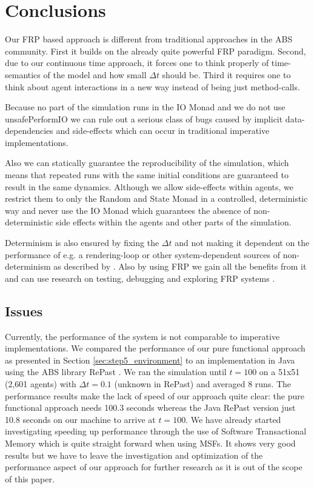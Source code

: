 \section{Conclusions}
\label{sec:conclusions}

Our FRP based approach is different from traditional approaches in the ABS community. First it builds on the already quite powerful FRP paradigm. Second, due to our continuous time approach, it forces one to think properly of time-semantics of the model and how small $\Delta t$ should be. Third it requires one to think about agent interactions in a new way instead of being just method-calls.

Because no part of the simulation runs in the IO Monad and we do not use unsafePerformIO we can rule out a serious class of bugs caused by implicit data-dependencies and side-effects which can occur in traditional imperative implementations.

Also we can statically guarantee the reproducibility of the simulation, which means that repeated runs with the same initial conditions are guaranteed to result in the same dynamics. Although we allow side-effects within agents, we restrict them to only the Random and State Monad in a controlled, deterministic way and never use the IO Monad which guarantees the absence of non-deterministic side effects within the agents and other parts of the simulation.

Determinism is also ensured by fixing the $\Delta t$ and not making it dependent on the performance of e.g. a rendering-loop or other system-dependent sources of non-determinism as described by \cite{perez_testing_2017}. Also by using FRP we gain all the benefits from it and can use research on testing, debugging and exploring FRP systems \cite{perez_testing_2017, perez_back_2017}.

\subsection*{Issues}
Currently, the performance of the system is not comparable to imperative implementations. We compared the performance of our pure functional approach as presented in Section \ref{sec:step5_environment} to an implementation in Java using the ABS library RePast \cite{north_complex_2013}. We ran the simulation until $t = 100$ on a 51x51 (2,601 agents) with $\Delta t = 0.1$ (unknown in RePast) and averaged 8 runs. The performance results make the lack of speed of our approach quite clear: the pure functional approach needs 100.3 seconds whereas the Java RePast version just 10.8 seconds on our machine to arrive at $t = 100$. We have already started investigating speeding up performance through the use of Software Transactional Memory \cite{harris_composable_2005, harris_transactional_2006} which is quite straight forward when using MSFs. It shows very good results but we have to leave the investigation and optimization of the performance aspect of our approach for further research as it is out of the scope of this paper.

